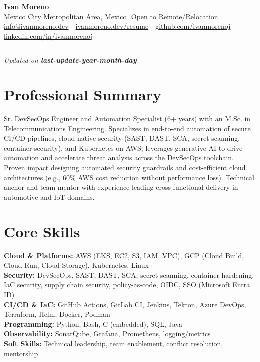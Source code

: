 \documentclass[11pt,a4paper]{article}
\newcommand{\sep}{\,\textbar\,}
\newcommand{\skillcat}[2]{\textbf{#1:} #2\\}
\begin{document}
{\LARGE \textbf{Ivan Moreno}}\\[2pt]
\small Mexico City Metropolitan Area, Mexico \sep Open to Remote/Relocation\\
\small \href{mailto:info@ivanmoreno.dev}{info@ivanmoreno.dev} \sep 
\href{https://ivanmoreno.dev/resume}{ivanmoreno.dev/resume} \sep 
\href{https://github.com/ivanmorenoj}{github.com/ivanmorenoj} \sep 
\href{https://www.linkedin.com/in/ivanmorenoj}{linkedin.com/in/ivanmorenoj}

\vspace{6pt}
\hrule
\vspace{6pt}

\vspace{-18pt} \null \hfill {\tiny \textit{Updated on \textbf{last-update-year-month-day}}}

\section*{Professional Summary}
Sr. DevSecOps Engineer and Automation Specialist (6+ years) with an M.Sc. in Telecommunications Engineering. Specializes in end-to-end automation of secure CI/CD pipelines, cloud-native security (SAST, DAST, SCA, secret scanning, container security), and Kubernetes on AWS; leverages generative AI to drive automation and accelerate threat analysis across the DevSecOps toolchain. Proven impact designing automated security guardrails and cost-efficient cloud architectures (e.g., 60\% AWS cost reduction without performance loss). Technical anchor and team mentor with experience leading cross-functional delivery in automotive and IoT domains.

\section*{Core Skills}
\skillcat{Cloud \& Platforms}{AWS (EKS, EC2, S3, IAM, VPC), GCP (Cloud Build, Cloud Run, Cloud Storage), Kubernetes, Linux}
\skillcat{Security}{DevSecOps, SAST, DAST, SCA, secret scanning, container hardening, IaC security, supply chain security, policy-as-code, OIDC, SSO (Microsoft Entra ID)}
\skillcat{CI/CD \& IaC}{GitHub Actions, GitLab CI, Jenkins, Tekton, Azure DevOps, Terraform, Helm, Docker, Podman}
\skillcat{Programming}{Python, Bash, C (embedded), SQL, Java}
\skillcat{Observability}{SonarQube, Grafana, Prometheus, logging/metrics}
\skillcat{Soft Skills}{Technical leadership, team enablement, conflict resolution, mentorship}
\end{document}
